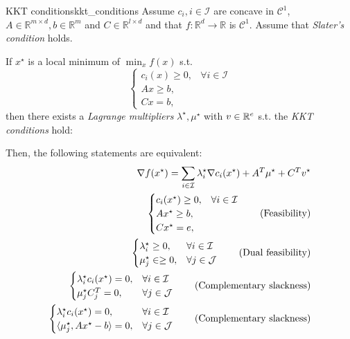 \begin{theorem}{KKT conditions}{kkt_conditions}
  Assume \(c_i, i \in \mathcal{I}\) are concave in \(\mathcal{C}^1\),
  \(A\in \mathbb{R}^{m \times d}, b \in \mathbb{R}^m\) and \(C\in \mathbb{R}^{l \times d}\) and that \(f:\mathbb{R}^d \to \mathbb{R}\) is \(\mathcal{C}^1\). Assume that \emph{Slater's condition} holds.

  If \(x^\star\) is a local minimum of \(\min_x f(x)\) s.t.
  \[
    \begin{cases}
      c_i(x) \geq 0, & \forall i \in \mathcal{I} \\
      Ax \geq b,     &                           \\
      Cx = b,        &
    \end{cases}
  \]
  then there exists a \emph{Lagrange multipliers} \(\lambda^\star, \mu^\star\) with \(v \in \mathbb{R}^e\) s.t. the \emph{KKT conditions} hold:

  Then, the following statements are equivalent:
  \begin{align}
    \nabla f(x^\star) = \sum_{i\in \mathcal{I}} \lambda_i^\star \nabla c_i(x^\star) + A^T \mu^\star + C^T v^\star \\
    \begin{cases}
      c_i(x^\star) \geq 0, & \forall i \in \mathcal{I} \\
      Ax^\star \geq b,     &                           \\
      Cx^\star = e,        &                           \\
    \end{cases} \tag{Feasibility}                                                              \\
    \begin{cases}
      \lambda_i^\star \geq 0, & \forall i \in \mathcal{I} \\
      \mu_j^\star \in \geq 0, & \forall j \in \mathcal{J} \\
    \end{cases} \tag{Dual feasibility}                                                           \\
    \begin{cases}
      \lambda_i^\star c_i(x^\star) = 0, & \forall i \in \mathcal{I} \\
      \mu_j^\star C_j^T = 0,            & \forall j \in \mathcal{J} \\
    \end{cases} \tag{Complementary slackness}                                                 \\
    \begin{cases}
      \lambda_i^\star c_i(x^\star) = 0,      & \forall i \in \mathcal{I} \\
      \langle\mu_j^\star, Ax^\star - b\rangle = 0, & \forall j \in \mathcal{J} \\
    \end{cases} \tag{Complementary slackness}
  \end{align}
\end{theorem}

